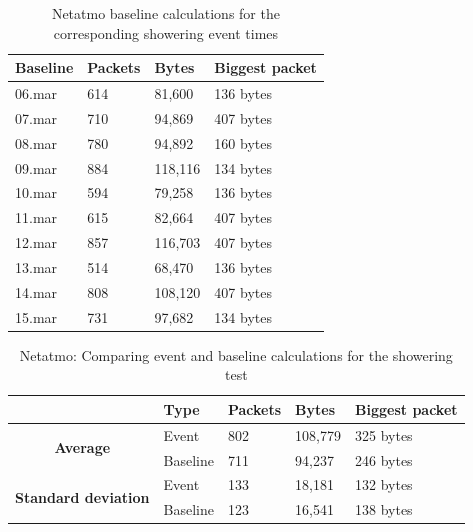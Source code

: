 \begin{table}[H]
    \centering
    \caption{Netatmo baseline calculations for the corresponding showering event times}
    \begin{tabular}{|l|l|l|l|}
    \hline
        \textbf{Baseline} & \textbf{Packets} & \textbf{Bytes} & \textbf{Biggest packet} \\ \hline
        06.mar & 614 & 81,600  & 136 bytes\\ \hline
        07.mar & 710 & 94,869  & 407 bytes\\ \hline
        08.mar & 780 & 94,892  & 160 bytes \\ \hline
        09.mar & 884 & 118,116 & 134 bytes \\ \hline
        10.mar & 594 & 79,258  & 136 bytes \\ \hline
        11.mar & 615 & 82,664  & 407 bytes \\ \hline
        12.mar & 857 & 116,703 & 407 bytes \\ \hline
        13.mar & 514 & 68,470  & 136 bytes \\ \hline
        14.mar & 808 & 108,120 & 407 bytes \\ \hline
        15.mar & 731 & 97,682  & 134 bytes \\ \hline
    \end{tabular}
    \label{tab:NetatmoBaselineShowerCalculations}
\end{table}

\begin{table}[H]
    \centering
    \caption{Netatmo: Comparing event and baseline calculations for the showering test}
    \begin{tabular}{c|l|l|l|l|}
        \cline{2-5}
        \multicolumn{1}{l|}{}                                              & \textbf{Type} & \textbf{Packets} & \textbf{Bytes} & \textbf{Biggest packet} \\ \hline
        \multicolumn{1}{|c|}{\multirow{2}{*}{\textbf{Average}}}            & Event         & 802              & 108,779        & 325 bytes               \\ \cline{2-5} 
        \multicolumn{1}{|c|}{}                                             & Baseline      & 711              & 94,237         & 246 bytes                \\ \hline
        \multicolumn{1}{|c|}{\multirow{2}{*}{\textbf{Standard deviation}}} & Event         & 133              & 18,181         & 132 bytes                 \\ \cline{2-5} 
        \multicolumn{1}{|c|}{}                                             & Baseline      & 123              & 16,541         & 138 bytes               \\ \hline          
    \end{tabular}
    \label{tab:NetatmoComparingBaselineAndShowerCalculations}
\end{table}

